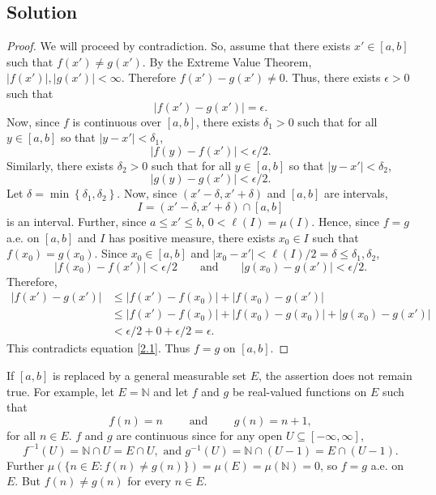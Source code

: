 \documentclass[12pt]{article}
\begin{document}
\subsection*{Solution}
\begin{proof}
We will proceed by contradiction. So, assume that there exists $x' \in [a,b]$ such that $f(x') \neq g(x')$. By the Extreme Value Theorem, $|f(x')|,
|g(x')| < \infty$. Therefore $f(x') - g(x') \neq 0$. Thus, there exists $\epsilon > 0$ such that 
\begin{equation}
|f(x') - g(x')| = \epsilon.
\label{2.1}
\end{equation} 
Now, since $f$ is
continuous over $[a,b]$, there exists $\delta_{1} > 0$ such that for all $y \in [a,b]$ so that $|y - x'| < \delta_{1}$, 
\[ |f(y) - f(x')| < \epsilon /2. \]
Similarly, there exists $\delta_{2} > 0$ such that for all $y \in [a,b]$ so that $|y - x'| < \delta_{2}$,
\[ |g(y) - g(x')| < \epsilon / 2. \]
Let $\delta = \min\left\{ \delta_{1}, \delta_{2} \right\}$. Now, since $(x'  - \delta, x' + \delta)$ and $[a,b]$ are intervals, 
\[ I = (x' -\delta, x' + \delta) \cap [a,b] \]
is an interval. Further, since $a \leq x' \leq b$, $0 < \ell(I) = \mu(I)$. Hence, since $f = g$ a.e. on $[a,b]$ and $I$ has positive measure, there exists $x_{0} \in I$ such that
$f(x_{0}) = g(x_{0})$. Since $x_{0} \in [a,b]$ and $|x_{0} - x'| < \ell(I) / 2 = \delta \leq \delta_{1}, \delta_{2}$,
\[ |f(x_{0}) - f(x')| < \epsilon / 2 \qquad \text{and} \qquad |g(x_{0}) - g(x')| < \epsilon / 2. \]
Therefore,
\begin{align*}
|f(x') - g(x')| & \leq |f(x') - f(x_{0})| + |f(x_{0}) - g(x')| \\
& \leq |f(x') - f(x_{0})| + |f(x_{0}) - g(x_{0})| + |g(x_{0}) - g(x')| \\
& < \epsilon / 2 + 0  + \epsilon / 2 = \epsilon.
\end{align*}
This contradicts equation \ref{2.1}. Thus $f = g$ on $[a,b]$.
\end{proof}
If $[a,b]$ is replaced by a general measurable set $E$, the assertion does not remain true. For example, let $E = \mathbb{N}$ and let $f$ and $g$ be
real-valued functions on $E$ such that 
\[ f(n) = n \qquad \text{ and } \qquad g(n) = n+1, \]
for all $n \in E$. $f$ and $g$ are continuous since for any open $U \subseteq [-\infty, \infty]$,
\[ f^{-1}(U) = \mathbb{N} \cap U = E \cap U, \text{ and } g^{-1}(U) = \mathbb{N} \cap (U - 1) = E \cap (U - 1). \]
Further $\mu\left( \{n \in E : f(n) \neq g(n)\} \right) = \mu(E) = \mu(\mathbb{N}) = 0$, so $f = g$ a.e. on $E$. But $f(n) \neq g(n)$ for every $n \in E$.
\end{document}
